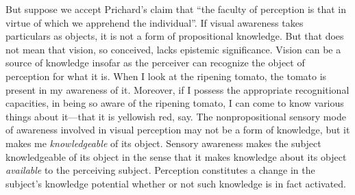 \documentclass[12pt]{article}
\begin{document}
But suppose we accept Prichard's claim that ``the faculty of perception is that in virtue of which we apprehend the individual''. If visual awareness takes particulars as objects, it is not a form of propositional knowledge. But that does not mean that vision, so conceived, lacks epistemic significance. Vision can be a source of knowledge insofar as the perceiver can recognize the object of perception for what it is. When I look at the ripening tomato, the tomato is present in my awareness of it. Moreover, if I possess the appropriate recognitional capacities, in being so aware of the ripening tomato, I can come to know various things about it---that it is yellowish red, say. The nonpropositional sensory mode of awareness involved in visual perception may not be a form of knowledge, but it makes me \emph{knowledgeable} of its object. Sensory awareness makes the subject knowledgeable of its object in the sense that it makes knowledge about its object \emph{available} to the perceiving subject. Perception constitutes a change in the subject's knowledge potential whether or not such knowledge is in fact activated.

\end{document}

